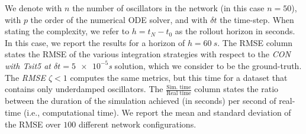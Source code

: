 \begin{table}[ht]
{    We denote with $n$ the number of oscillators in the network (in this case $n=50$), with $p$ the order of the numerical \gls{ODE} solver, and with $\delta t$ the time-step.
    When stating the complexity, we refer to $h = t_N-t_0$ as the rollout horizon in seconds. In this case, we report the results for a horizon of $h = \SI{60}{s}$.
    The \gls{RMSE} column states the \gls{RMSE} of the various integration strategies with respect to the \emph{CON with Tsit5 at $\delta t = \num{5e-5}$s} solution, which we consider to be the ground-truth.
    The \emph{RMSE $\zeta < 1$} computes the same metrics, but this time for a dataset that contains only underdamped oscillators.
    The \emph{$\frac{\text{Sim. time}}{\text{Real time}}$} column states the ratio between the duration of the simulation achieved (in seconds) per second of real-time (i.e., computational time).
    We report the mean and standard deviation of the \gls{RMSE} over $100$ different network configurations.
    }
    \label{tab:con:cfa_evaluation}
\end{table}